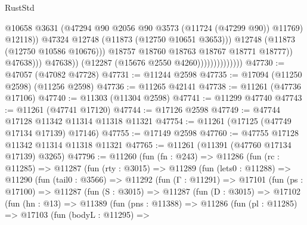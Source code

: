 \begin{lexlean}{RustStd}
\begin{coremodule}
                                                  @10658
                                                  @3631
                                                  (@47294
                                                    @90
                                                    @2056
                                                    @90
                                                    @3573
                                                    (@11724 (@47299 @90))
                                                    @11769)
                                                  @12118))
                                              @47324
                                              @12748
                                              (@11873 (@12750 @10651 @3653)))
                                            @12748
                                            (@11873 (@12750 @10586 @10676)))
                                          @18757
                                          @18760
                                          @18763
                                          @18767
                                          @18771
                                          @18777))
                                      @47638)))
                                @47638))
                            (@12287 (@15676 @2550 @4260))))))))))))))
@47730 := @47057 (@47082 @47728)
@47731 := @11244 @2598
@47735 := @17094 (@11250 @2598) (@11256 @2598)
@47736 := @11265 @42141
@47738 := @11261 (@47736 @17106)
@47740 := @11303 (@11304 @2598)
@47741 := @11299 @47740
@47743 := @11261 (@47741 @17120)
@47744 := @17126 @2598
@47749 := @47744 @17128 @11342 @11314 @11318 @11321
@47754 := @11261 (@17125 (@47749 @17134 @17139) @17146)
@47755 := @17149 @2598
@47760 := @47755 @17128 @11342 @11314 @11318 @11321
@47765 := @11261 (@11391 (@47760 @17134 @17139) @3265)
@47796 := @11260
    (fun (fn : @243) =>
    @11286
      (fun (rc : @11285) =>
      @11287
        (fun (rty : @3015) =>
        @11289
          (fun (lets0 : @11288) =>
          @11290
            (fun (tail0 : @3566) =>
            @11292
              (fun (Γ : @11291) =>
              @17101
                (fun (ps : @17100) =>
                @11287
                  (fun (S : @3015) =>
                  @11287
                    (fun (D : @3015) =>
                    @17102
                      (fun (hn : @13) =>
                      @11389
                        (fun (pns : @11388) =>
                        @11286
                          (fun (pl : @11285) =>
                          @17103
                            (fun (bodyL : @11295) =>

\end{coremodule}
\end{lexlean}
